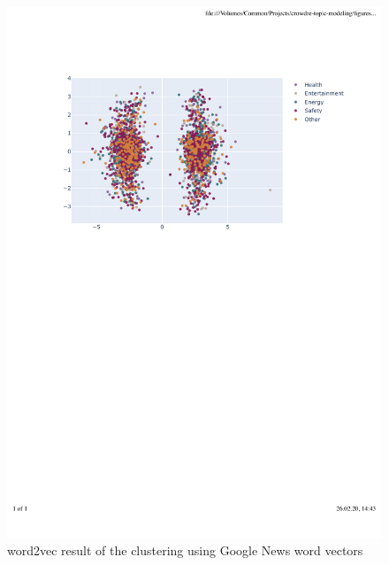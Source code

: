 \begin{figure}[ht]
  \begin{center}
    \includegraphics[width=\textwidth]{figures/word2vec_pretrained_pca-legend.pdf}
    \caption{word2vec result of the clustering using Google News word vectors}
    \label{fig:w2v-pretrained-4}
  \end{center}
\end{figure}
\FloatBarrier

